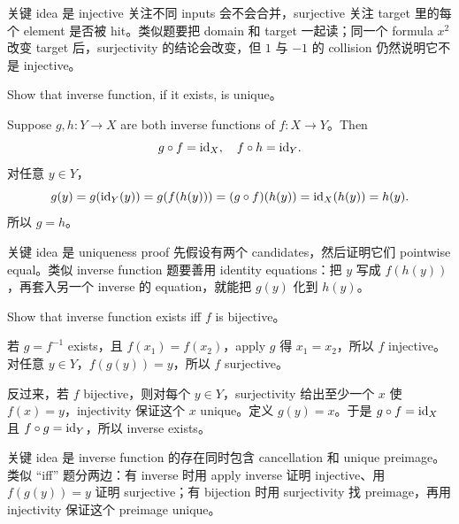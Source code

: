 \begin{explanation}
关键 idea 是 injective 关注不同 inputs 会不会合并，surjective 关注 target 里的每个 element 是否被 hit。类似题要把 domain 和 target 一起读；同一个 formula \(x^2\) 改变 target 后，surjectivity 的结论会改变，但 \(1\) 与 \(-1\) 的 collision 仍然说明它不是 injective。
\end{explanation}

\begin{exerciseblock}
Show that inverse function, if it exists, is unique。
\end{exerciseblock}

\begin{solution}
Suppose \(g,h:Y\to X\) are both inverse functions of \(f:X\to Y\)。Then
\[
g\circ f=\mathrm{id}_X,\quad f\circ h=\mathrm{id}_Y.
\]
对任意 \(y\in Y\)，
\[
g(y)=g(\mathrm{id}_Y(y))=g(f(h(y)))=(g\circ f)(h(y))=\mathrm{id}_X(h(y))=h(y).
\]
所以 \(g=h\)。
\end{solution}

\begin{explanation}
关键 idea 是 uniqueness proof 先假设有两个 candidates，然后证明它们 pointwise equal。类似 inverse function 题要善用 identity equations：把 \(y\) 写成 \(f(h(y))\)，再套入另一个 inverse 的 equation，就能把 \(g(y)\) 化到 \(h(y)\)。
\end{explanation}

\begin{exerciseblock}
Show that inverse function exists iff \(f\) is bijective。
\end{exerciseblock}

\begin{solution}
若 \(g=f^{-1}\) exists，且 \(f(x_1)=f(x_2)\)，apply \(g\) 得 \(x_1=x_2\)，所以 \(f\) injective。对任意 \(y\in Y\)，\(f(g(y))=y\)，所以 \(f\) surjective。

反过来，若 \(f\) bijective，则对每个 \(y\in Y\)，surjectivity 给出至少一个 \(x\) 使 \(f(x)=y\)，injectivity 保证这个 \(x\) unique。定义 \(g(y)=x\)。于是 \(g\circ f=\mathrm{id}_X\) 且 \(f\circ g=\mathrm{id}_Y\)，所以 inverse exists。
\end{solution}

\begin{explanation}
关键 idea 是 inverse function 的存在同时包含 cancellation 和 unique preimage。类似 ``iff'' 题分两边：有 inverse 时用 apply inverse 证明 injective、用 \(f(g(y))=y\) 证明 surjective；有 bijection 时用 surjectivity 找 preimage，再用 injectivity 保证这个 preimage unique。
\end{explanation}

